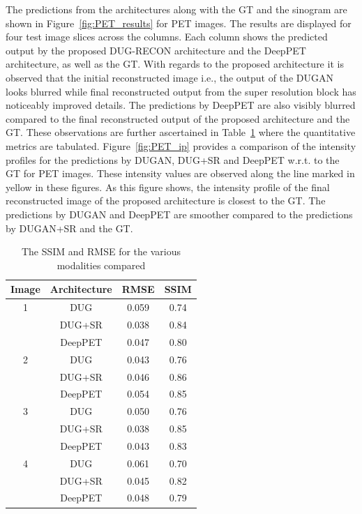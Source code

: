 The predictions from the architectures along with the \ac{GT} and the sinogram are shown in Figure~\ref{fig:PET_results} for \ac{PET} images. The results are displayed for four test image slices across the columns. Each column shows the predicted output by the proposed DUG-RECON architecture and the DeepPET architecture, as well as the \ac{GT}. With regards to the proposed architecture it is observed that the initial reconstructed image i.e., the output of the \ac{DUGAN} looks blurred while final reconstructed output from the super resolution block has noticeably improved details. The predictions by DeepPET are also visibly blurred compared to the final reconstructed output of the proposed architecture and the \ac{GT}. These observations are further ascertained in Table~\ref{table:3} where the quantitative metrics are tabulated. Figure~\ref{fig:PET_ip} provides a comparison of the intensity profiles for the predictions by \ac{DUGAN}, DUG+SR and DeepPET w.r.t. to the \ac{GT} for \ac{PET} images. These intensity values are observed along the line marked in yellow in these figures. As this figure shows, the intensity profile of the final reconstructed image of the proposed architecture is closest to the \ac{GT}. The predictions by \ac{DUGAN} and DeepPET are smoother compared to the predictions by \ac{DUGAN}+SR and the \ac{GT}.

\begin{table}[h!]
	\centering
	\caption{The \ac{SSIM} and \ac{RMSE} for the various modalities compared}
	\label{table:3}
	\begin{tabular}{||c|c|c|c||} 
		\hline
		Image & Architecture & \ac{RMSE} & \ac{SSIM} \\ [0.5ex] 
		\hline\hline
		1 & DUG & 0.059 & 0.74 \\ 
		& DUG+SR & 0.038 & 0.84 \\
		& DeepPET & 0.047 & 0.80 \\
		\hline
		2 & DUG & 0.043 & 0.76 \\ 
		& DUG+SR & 0.046 & 0.86 \\
		& DeepPET & 0.054 & 0.85 \\
		\hline
		3 & DUG & 0.050 & 0.76 \\ 
		
		& DUG+SR & 0.038 & 0.85 \\  
		& DeepPET & 0.043 & 0.83 \\  
		\hline  
		4 & DUG & 0.061 & 0.70 \\ 
		& DUG+SR & 0.045 & 0.82 \\  
		& DeepPET & 0.048 & 0.79 \\  
		\hline  
	\end{tabular}
	
\end{table}

